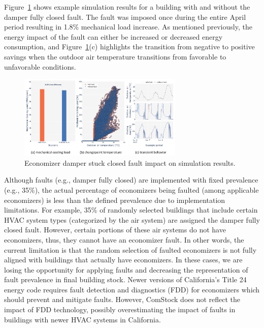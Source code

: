 Figure~\ref{fig:econ_damper_fault_single_model} shows example simulation results for a building with and without the damper fully closed fault. The fault was imposed once during the entire April period resulting in 1.8\% mechanical load increase. As mentioned previously, the energy impact of the fault can either be increased or decreased energy consumption, and Figure~\ref{fig:econ_damper_fault_single_model}(c) highlights the transition from negative to positive savings when the outdoor air temperature transitions from favorable to unfavorable conditions.

\begin{figure}
  \centering \includegraphics[width=0.7\textwidth]{figures/econ_damper_fault_single_model.png}
  \caption{Economizer damper stuck closed fault impact on simulation results.}
  \label{fig:econ_damper_fault_single_model}
\end{figure}

Although faults (e.g., damper fully closed) are implemented with fixed prevalence (e.g., 35\%), the actual percentage of economizers being faulted (among applicable economizers) is less than the defined prevalence due to implementation limitations. For example, 35\% of randomly selected buildings that include certain HVAC system types (categorized by the air system) are assigned the damper fully closed fault. However, certain portions of these air systems do not have economizers, thus, they cannot have an economizer fault. In other words, the current limitation is that the random selection of faulted economizers is not fully aligned with buildings that actually have economizers. In these cases, we are losing the opportunity for applying faults and decreasing the representation of fault prevalence in final building stock. Newer versions of California's Title 24 energy code requires fault detection and diagnostics (FDD) for economizers which should prevent and mitigate faults. However, ComStock does not reflect the impact of FDD technology, possibly overestimating the impact of faults in buildings with newer HVAC systems in California.


